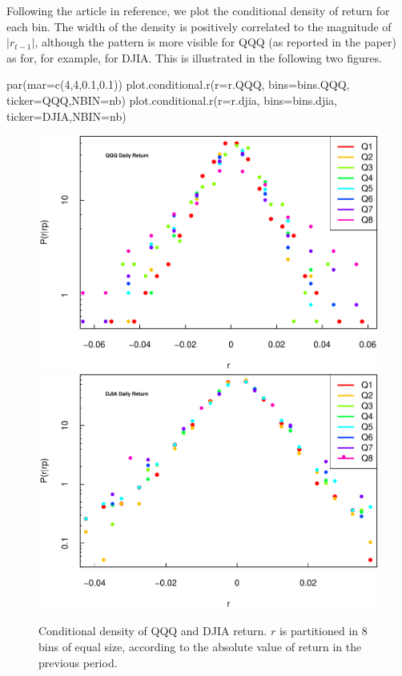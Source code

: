 \documentclass[
  11pt,
]{article}
\newenvironment{Shaded}{\begin{snugshade}}{\end{snugshade}}
\newcommand{\AttributeTok}[1]{\textcolor[rgb]{0.77,0.63,0.00}{#1}}
\newcommand{\DecValTok}[1]{\textcolor[rgb]{0.00,0.00,0.81}{#1}}
\newcommand{\FloatTok}[1]{\textcolor[rgb]{0.00,0.00,0.81}{#1}}
\newcommand{\FunctionTok}[1]{\textcolor[rgb]{0.00,0.00,0.00}{#1}}
\newcommand{\NormalTok}[1]{#1}
\newcommand{\StringTok}[1]{\textcolor[rgb]{0.31,0.60,0.02}{#1}}
\begin{document}
Following the article in reference, we plot the conditional density of
return for each bin. The width of the density is positively correlated
to the magnitude of \(|r_{t-1}|\), although the pattern is more visible
for QQQ (as reported in the paper) as for, for example, for DJIA. This
is illustrated in the following two figures.

\begin{Shaded}
\begin{Highlighting}[]
\FunctionTok{par}\NormalTok{(}\AttributeTok{mar=}\FunctionTok{c}\NormalTok{(}\DecValTok{4}\NormalTok{,}\DecValTok{4}\NormalTok{,}\FloatTok{0.1}\NormalTok{,}\FloatTok{0.1}\NormalTok{))}
\FunctionTok{plot.conditional.r}\NormalTok{(}\AttributeTok{r=}\NormalTok{r.QQQ, }\AttributeTok{bins=}\NormalTok{bins.QQQ, }\AttributeTok{ticker=}\StringTok{\textquotesingle{}QQQ\textquotesingle{}}\NormalTok{,}\AttributeTok{NBIN=}\NormalTok{nb)}
\FunctionTok{plot.conditional.r}\NormalTok{(}\AttributeTok{r=}\NormalTok{r.djia, }\AttributeTok{bins=}\NormalTok{bins.djia, }\AttributeTok{ticker=}\StringTok{\textquotesingle{}DJIA\textquotesingle{}}\NormalTok{,}\AttributeTok{NBIN=}\NormalTok{nb)}
\end{Highlighting}
\end{Shaded}

\begin{figure}[H]
\includegraphics[width=0.5\linewidth]{figs/condist-plot-1} \includegraphics[width=0.5\linewidth]{figs/condist-plot-2} \caption{Conditional density of QQQ and DJIA return. $r$ is partitioned in 8 bins of equal size, according to the absolute value of return in the previous period.}\label{fig:condist-plot}
\end{figure}
\end{document}
